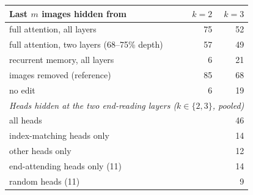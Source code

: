 \begin{tabular}{lrr}
\toprule
Last $m$ images hidden from & $k=2$ & $k=3$ \\
\midrule
full attention, all layers & 75 & 52 \\
full attention, two layers (68--75\% depth) & 57 & 49 \\
recurrent memory, all layers & 6 & 21 \\
images removed (reference) & 85 & 68 \\
no edit & 6 & 19 \\
\midrule
\multicolumn{3}{l}{\textit{Heads hidden at the two end-reading layers ($k\in\{2,3\}$, pooled)}} \\
all heads & \multicolumn{2}{r}{46} \\
index-matching heads only & \multicolumn{2}{r}{14} \\
other heads only & \multicolumn{2}{r}{12} \\
end-attending heads only (11) & \multicolumn{2}{r}{14} \\
random heads (11) & \multicolumn{2}{r}{9} \\
\bottomrule
\end{tabular}
